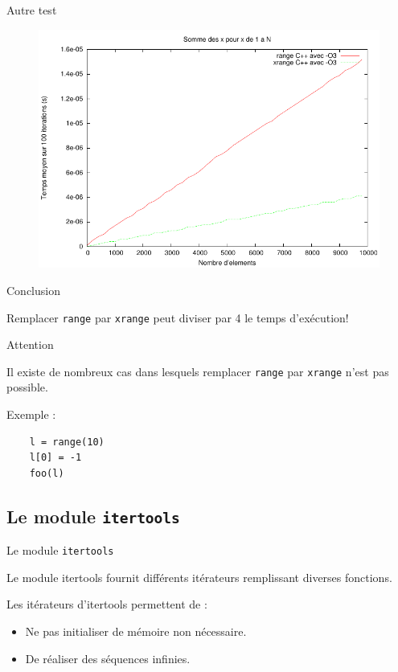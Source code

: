 \documentclass{beamer}
\begin{document}
\begin{frame}{Autre test}

  \begin{figure}[h]
    \includegraphics[width=\textwidth]{./Pictures/RangeXrangeCppO3}
    \label{rangexrange}
  \end{figure}

\end{frame}

\begin{frame}[fragile]{Conclusion}

  Remplacer \texttt{range} par \texttt{xrange} peut diviser par 4 le
  temps d'exécution!

  \pause
  \begin{alertblock}{Attention}

    Il existe de nombreux cas dans lesquels remplacer \texttt{range}
    par \texttt{xrange} n'est pas possible.

  \end{alertblock}

  \pause
  Exemple :
  
  \begin{lstlisting}
    l = range(10)
    l[0] = -1
    foo(l)
  \end{lstlisting}


\end{frame}

\subsection{Le module \texttt{itertools}}

\begin{frame}{Le module \texttt{itertools}}

  Le module itertools fournit différents itérateurs remplissant
  diverses fonctions.

  Les itérateurs d'itertools permettent de :

  \begin{itemize}
    \pause \item Ne pas initialiser de mémoire non nécessaire.
    \pause \item De réaliser des séquences infinies.
  \end{itemize}

\end{frame}
\end{document}
